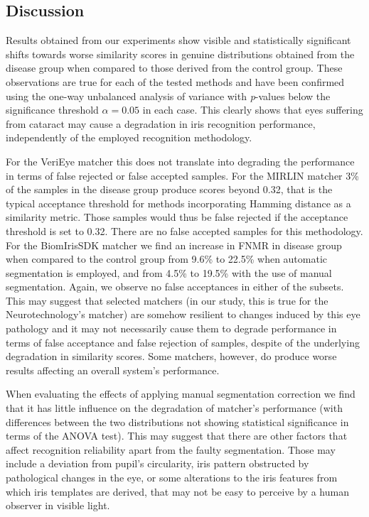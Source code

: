 \documentclass[a4paper]{spie}
\begin{document}
\subsection{Discussion}
Results obtained from our experiments show visible and statistically significant shifts towards worse similarity scores in genuine distributions obtained from the disease group when compared to those derived from the control group. These observations are true for each of the tested methods and have been confirmed using the one-way unbalanced analysis of variance with \emph{p}-values below the significance threshold $\alpha=0.05$ in each case. This clearly shows that eyes suffering from cataract may cause a degradation in iris recognition performance, independently of the employed recognition methodology.

For the VeriEye matcher this does not translate into degrading the performance in terms of false rejected or false accepted samples. For the MIRLIN matcher 3\% of the samples in the disease group produce scores beyond 0.32, that is the typical acceptance threshold for methods incorporating Hamming distance as a similarity metric. Those samples would thus be false rejected if the acceptance threshold is set to 0.32. There are no false accepted samples for this methodology. For the BiomIrisSDK matcher we find an increase in FNMR in disease group when compared to the control group from 9.6\% to 22.5\% when automatic segmentation is employed, and from 4.5\% to 19.5\% with the use of manual segmentation. Again, we observe no false acceptances in either of the subsets. This may suggest that selected matchers (in our study, this is true for the Neurotechnology's matcher) are somehow resilient to changes induced by this eye pathology and it may not necessarily cause them to degrade performance in terms of false acceptance and false rejection of samples, despite of the underlying degradation in similarity scores. Some matchers, however, do produce worse results affecting an overall system's performance.

When evaluating the effects of applying manual segmentation correction we find that it has little influence on the degradation of matcher's performance (with differences between the two distributions not showing statistical significance in terms of the ANOVA test). This may suggest that there are other factors that affect recognition reliability apart from the faulty segmentation. Those may include a deviation from pupil's circularity, iris pattern obstructed by pathological changes in the eye, or some alterations to the iris features from which iris templates are derived, that may not be easy to perceive by a human observer in visible light.
\end{document}
